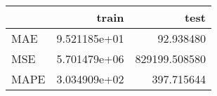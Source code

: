 \begin{tabular}{lrr}
\toprule
{} &         train &           test \\
\midrule
MAE  &  9.521185e+01 &      92.938480 \\
MSE  &  5.701479e+06 &  829199.508580 \\
MAPE &  3.034909e+02 &     397.715644 \\
\bottomrule
\end{tabular}
